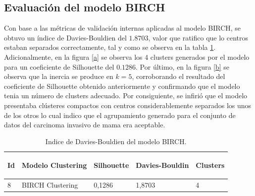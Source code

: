 \subsection{Evaluación del modelo BIRCH}
Con base a las métricas de validación internas aplicadas al modelo BIRCH, se obtuvo un índice de Davies-Bouldien del $1.8703$, valor que ratifico que lo centros estaban separados correctamente, tal y como se observa en la tabla \ref{Davies-Bouldien}. Adicionalmente, en la figura \ref{a} se observa los 4 clusters generados por el modelo para un coeficiente de Silhouette del $0.1286$. Por último, en la figura \ref{b} se observa que la inercia se produce en $k = 5 $, corroborando el resultado del coeficiente de Silhouette obtenido anteriormente y confirmando que el modelo tenia un número de clusters adecuado. Por consiguiente, se infirió que el modelo presentaba clústeres compactos con centros considerablemente separados los unos de los otros lo cual indico que el agrupamiento generado para el conjunto de datos del carcinoma invasivo de mama era aceptable. 

\begin{table}[!htb]
	\footnotesize
	\centering
	\begin{threeparttable}
		\begin{tabular}{p{1cm} p{4cm} p{2.5cm} p{2.5cm} p{1.5cm}} \toprule	
			\begin{center}Id\end{center}
			&\begin{center}Modelo Clustering\end{center}
			&\begin{center}Silhouette\end{center}
			&\begin{center}Davies-Bouldin\end{center}
			&\begin{center}Clusters\end{center}
			\\ \hline 8 & BIRCH Clustering	&	0,1286	&	1,8703	&	4
			\\ \hline
		\end{tabular}
		\caption{Indice de Davies-Bouldien del modelo BIRCH.}
		\label{Davies-Bouldien}
	\end{threeparttable}
\end{table}

